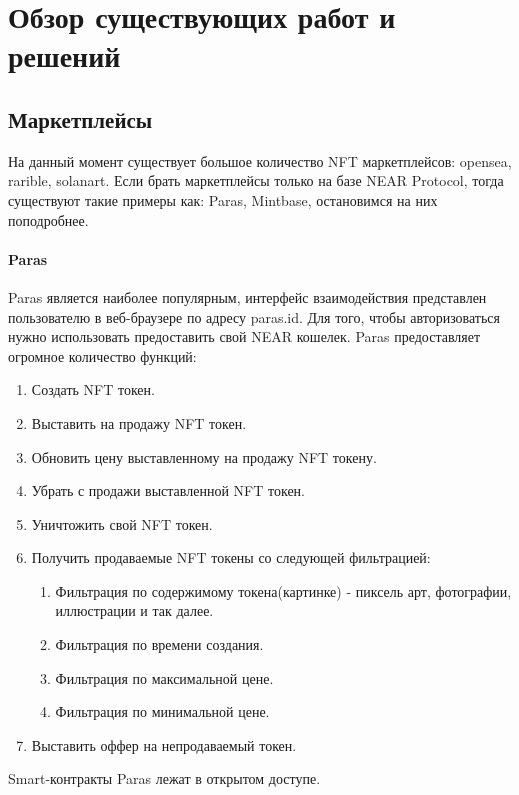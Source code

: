 \section{Обзор существующих работ и решений}
\label{section.3}
\subsection{Маркетплейсы}
На данный момент существует большое количество NFT маркетплейсов: opensea\cite{opensea}, rarible\cite{rarible}, solanart\cite{solanart}. Если брать маркетплейсы только на базе NEAR Protocol, тогда существуют такие примеры как: Paras\cite{paras}, Mintbase\cite{mintbase}, остановимся на них поподробнее.

\paragraph{Paras}

Paras является наиболее популярным, интерфейс взаимодействия представлен пользователю в веб-браузере по адресу paras.id. Для того, чтобы авторизоваться нужно использовать 
предоставить свой NEAR кошелек. Paras предоставляет огромное количество функций:
\begin{enumerate}
    \item Создать NFT токен.
    \item Выставить на продажу NFT токен.
    \item Обновить цену выставленному на продажу NFT токену.
    \item Убрать с продажи выставленной NFT токен.
    \item Уничтожить свой NFT токен.
    \item Получить продаваемые NFT токены со следующей фильтрацией:
        \begin{enumerate}
            \item Фильтрация по содержимому токена(картинке) - пиксель арт, фотографии, иллюстрации и так далее.
            \item Фильтрация по времени создания.
            \item Фильтрация по максимальной цене.
            \item Фильтрация по минимальной цене.
        \end{enumerate}
    \item Выставить оффер на непродаваемый токен.
\end{enumerate}

Smart-контракты Paras лежат в открытом доступе\cite{parasnftcontract, parasmarketplacecontract}.


